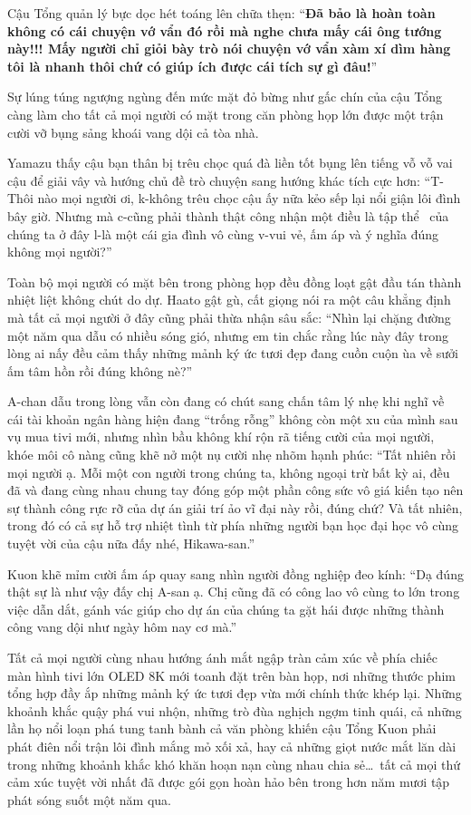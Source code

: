 \documentclass[../main.tex]{subfiles}
\begin{document}
Cậu Tổng quản lý bực dọc hét toáng lên chữa thẹn: ``\textbf{Đã bảo là hoàn toàn không có cái chuyện vớ vẩn đó rồi mà nghe chưa mấy cái ông tướng này!!! Mấy người chỉ giỏi bày trò nói chuyện vớ vẩn xàm xí dìm hàng tôi là nhanh thôi chứ có giúp ích được cái tích sự gì đâu!}''

Sự lúng túng ngượng ngùng đến mức mặt đỏ bừng như gấc chín của cậu Tổng càng làm cho tất cả mọi người có mặt trong căn phòng họp lớn được một trận cười vỡ bụng sảng khoái vang dội cả tòa nhà.

Yamazu thấy cậu bạn thân bị trêu chọc quá đà liền tốt bụng lên tiếng vỗ vỗ vai cậu để giải vây và hướng chủ đề trò chuyện sang hướng khác tích cực hơn: ``T-Thôi nào mọi người ơi, k-không trêu chọc cậu ấy nữa kẻo sếp lại nổi giận lôi đình bây giờ. Nhưng mà c-cũng phải thành thật công nhận một điều là tập thể \hll\ của chúng ta ở đây l-là một cái gia đình vô cùng v-vui vẻ, ấm áp và ý nghĩa đúng không mọi người?''

Toàn bộ mọi người có mặt bên trong phòng họp đều đồng loạt gật đầu tán thành nhiệt liệt không chút do dự. Haato gật gù, cất giọng nói ra một câu khẳng định mà tất cả mọi người ở đây cũng phải thừa nhận sâu sắc: ``Nhìn lại chặng đường một năm qua dẫu có nhiều sóng gió, nhưng em tin chắc rằng lúc này đây trong lòng ai nấy đều cảm thấy những mảnh ký ức tươi đẹp đang cuồn cuộn ùa về sưởi ấm tâm hồn rồi đúng không nè?''

A-chan dẫu trong lòng vẫn còn đang có chút sang chấn tâm lý nhẹ khi nghĩ về cái tài khoản ngân hàng hiện đang ``trống rỗng'' không còn một xu của mình sau vụ mua tivi mới, nhưng nhìn bầu không khí rộn rã tiếng cười của mọi người, khóe môi cô nàng cũng khẽ nở một nụ cười nhẹ nhõm hạnh phúc: ``Tất nhiên rồi mọi người ạ. Mỗi một con người trong chúng ta, không ngoại trừ bất kỳ ai, đều đã và đang cùng nhau chung tay đóng góp một phần công sức vô giá kiến tạo nên sự thành công rực rỡ của dự án giải trí ảo vĩ đại này rồi, đúng chứ? Và tất nhiên, trong đó có cả sự hỗ trợ nhiệt tình từ phía những người bạn học đại học vô cùng tuyệt vời của cậu nữa đấy nhé, Hikawa-san.''

Kuon khẽ mỉm cười ấm áp quay sang nhìn người đồng nghiệp đeo kính: ``Dạ đúng thật sự là như vậy đấy chị A-san ạ. Chị cũng đã có công lao vô cùng to lớn trong việc dẫn dắt, gánh vác giúp cho dự án của chúng ta gặt hái được những thành công vang dội như ngày hôm nay cơ mà.''

Tất cả mọi người cùng nhau hướng ánh mắt ngập tràn cảm xúc về phía chiếc màn hình tivi lớn OLED 8K mới toanh đặt trên bàn họp, nơi những thước phim tổng hợp đầy ắp những mảnh ký ức tươi đẹp vừa mới chính thức khép lại. Những khoảnh khắc quậy phá vui nhộn, những trò đùa nghịch ngợm tinh quái, cả những lần họ nổi loạn phá tung tanh bành cả văn phòng khiến cậu Tổng Kuon phải phát điên nổi trận lôi đình mắng mỏ xối xả, hay cả những giọt nước mắt lăn dài trong những khoảnh khắc khó khăn hoạn nạn cùng nhau chia sẻ\dots\ tất cả mọi thứ cảm xúc tuyệt vời nhất đã được gói gọn hoàn hảo bên trong hơn năm mươi tập phát sóng suốt một năm qua.
\end{document}
